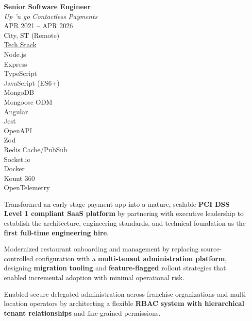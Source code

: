 \documentclass[10pt]{article}
\newcommand{\jobmeta}[5]{%
  \textbf{#1}\\
  \textit{#2}\\[4pt]
  {\color{lighttext}#3}\\
  {\color{lighttext}#4}\\[4pt]
  {\underline{\color{lighttext}Tech Stack}}\\
  {\color{lighttext}#5}%
}
\begin{document}
\begin{entryrow}
  {\jobmeta
    {Senior Software Engineer}
    {Up 'n go Contactless Payments}
    {APR 2021 -- APR 2026}
    {City, ST (Remote)}
    {
      Node.js\\
      Express\\
      TypeScript\\
      JavaScript (ES6+)\\
      MongoDB\\
      Mongoose ODM\\
      Angular\\
      Jest\\
      OpenAPI\\
      Zod\\
      Redis Cache/PubSub\\
      Socket.io\\
      Docker\\
      Kount 360\\
      OpenTelemetry
    }
  }
  \begin{resumeitems}
    \item Transformed an early-stage payment app into a mature, scalable \textbf{PCI DSS Level 1 compliant SaaS platform} by partnering with executive leadership to establish the architecture, engineering standards, and technical foundation as the \textbf{first full-time engineering hire}.
    
    \item Modernized restaurant onboarding and management by replacing source-controlled configuration with a \textbf{multi-tenant administration platform}, designing \textbf{migration tooling} and \textbf{feature-flagged} rollout strategies that enabled incremental adoption with minimal operational risk.
    \item Enabled secure delegated administration across franchise organizations and multi-location operators by architecting a flexible \textbf{RBAC system with hierarchical tenant relationships} and fine-grained permissions.
    

\end{resumeitems}
\end{entryrow}
\end{document}
